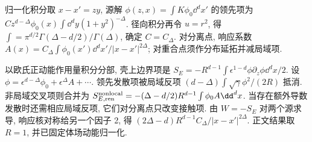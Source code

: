 归一化积分取 $x-x'=zy$, 源解 $\phi(z,x)=\int K\phi_0\dd^dx'$ 的领先项为 $Cz^{d-\Delta}\phi_0(x)\int\dd^dy(1+y^2)^{-\Delta}$. 径向积分再令 $u=r^2$, 得 $\int=\pi^{d/2}\Gamma(\Delta-d/2)/\Gamma(\Delta)$, 确定 $C=C_\Delta$. 对分离点, 响应系数 $A(x)=C_\Delta\int\phi_0(x')\dd^dx'/|x-x'|^{2\Delta}$; 对重合点须作分布延拓并减局域项.

以欧氏正动能作用量积分分部, 壳上边界项是 $S_E=-R^{d-1}\int\epsilon^{1-d}\phi\partial_z\phi\dd^dx/2$. 设 $\phi=\epsilon^{d-\Delta}\phi_0+\epsilon^\Delta A+\cdots$. 领先发散项被局域反项 $(d-\Delta)\int\sqrt\gamma\phi^2/(2R)$ 抵消. 非局域交叉项则合并为
$S_{E,\rm ren}^{\rm nonlocal}=-(\Delta-d/2)R^{d-1}\int\phi_0A\dd^dx$.
当存在额外导数发散时还需相应局域反项, 它们对分离点只改变接触项. 由 $W=-S_E$ 对两个源求导, 响应核对称给另一个因子 2, 得 $(2\Delta-d)R^{d-1}C_\Delta/|x-x'|^{2\Delta}$. 正文结果取 $R=1$, 并已固定体场动能归一化.
